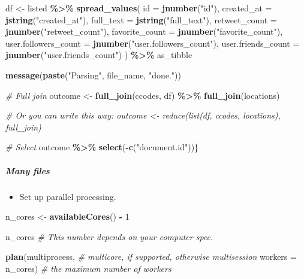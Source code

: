 \documentclass[
]{book}
\newenvironment{Shaded}{\begin{snugshade}}{\end{snugshade}}
\newcommand{\AttributeTok}[1]{\textcolor[rgb]{0.13,0.29,0.53}{#1}}
\newcommand{\CommentTok}[1]{\textcolor[rgb]{0.56,0.35,0.01}{\textit{#1}}}
\newcommand{\DecValTok}[1]{\textcolor[rgb]{0.00,0.00,0.81}{#1}}
\newcommand{\FunctionTok}[1]{\textcolor[rgb]{0.13,0.29,0.53}{\textbf{#1}}}
\newcommand{\NormalTok}[1]{#1}
\newcommand{\OtherTok}[1]{\textcolor[rgb]{0.56,0.35,0.01}{#1}}
\newcommand{\SpecialCharTok}[1]{\textcolor[rgb]{0.81,0.36,0.00}{\textbf{#1}}}
\newcommand{\StringTok}[1]{\textcolor[rgb]{0.31,0.60,0.02}{#1}}
\providecommand{\tightlist}{%
  \setlength{\itemsep}{0pt}\setlength{\parskip}{0pt}}
\begin{document}
\begin{Shaded}
\begin{Highlighting}[]
\NormalTok{df }\OtherTok{\textless{}{-}}\NormalTok{ listed }\SpecialCharTok{\%\textgreater{}\%}
  \FunctionTok{spread\_values}\NormalTok{(}
    \AttributeTok{id =} \FunctionTok{jnumber}\NormalTok{(}\StringTok{"id"}\NormalTok{),}
    \AttributeTok{created\_at =} \FunctionTok{jstring}\NormalTok{(}\StringTok{"created\_at"}\NormalTok{),}
    \AttributeTok{full\_text =} \FunctionTok{jstring}\NormalTok{(}\StringTok{"full\_text"}\NormalTok{),}
    \AttributeTok{retweet\_count =} \FunctionTok{jnumber}\NormalTok{(}\StringTok{"retweet\_count"}\NormalTok{),}
    \AttributeTok{favorite\_count =} \FunctionTok{jnumber}\NormalTok{(}\StringTok{"favorite\_count"}\NormalTok{),}
    \AttributeTok{user.followers\_count =} \FunctionTok{jnumber}\NormalTok{(}\StringTok{"user.followers\_count"}\NormalTok{),}
    \AttributeTok{user.friends\_count =} \FunctionTok{jnumber}\NormalTok{(}\StringTok{"user.friends\_count"}\NormalTok{)}
\NormalTok{  ) }\SpecialCharTok{\%\textgreater{}\%}
\NormalTok{      as\_tibble}

\FunctionTok{message}\NormalTok{(}\FunctionTok{paste}\NormalTok{(}\StringTok{"Parsing"}\NormalTok{, file\_name, }\StringTok{"done."}\NormalTok{))}

\CommentTok{\# Full join}
\NormalTok{outcome }\OtherTok{\textless{}{-}} \FunctionTok{full\_join}\NormalTok{(ccodes, df) }\SpecialCharTok{\%\textgreater{}\%} \FunctionTok{full\_join}\NormalTok{(locations)}

\CommentTok{\# Or you can write this way: outcome \textless{}{-} reduce(list(df, ccodes, locations), full\_join)}

\CommentTok{\# Select}
\NormalTok{outcome }\SpecialCharTok{\%\textgreater{}\%} \FunctionTok{select}\NormalTok{(}\SpecialCharTok{{-}}\FunctionTok{c}\NormalTok{(}\StringTok{"document.id"}\NormalTok{))\}}
\end{Highlighting}
\end{Shaded}

\subparagraph{Many files}\label{many-files}

\begin{itemize}
\tightlist
\item
  Set up parallel processing.
\end{itemize}

\begin{Shaded}
\begin{Highlighting}[]
\NormalTok{n\_cores }\OtherTok{\textless{}{-}} \FunctionTok{availableCores}\NormalTok{() }\SpecialCharTok{{-}} \DecValTok{1}

\NormalTok{n\_cores }\CommentTok{\# This number depends on your computer spec.}

\FunctionTok{plan}\NormalTok{(multiprocess, }\CommentTok{\# multicore, if supported, otherwise multisession}
     \AttributeTok{workers =}\NormalTok{ n\_cores) }\CommentTok{\# the maximum number of workers}
\end{Highlighting}
\end{Shaded}
\end{document}
